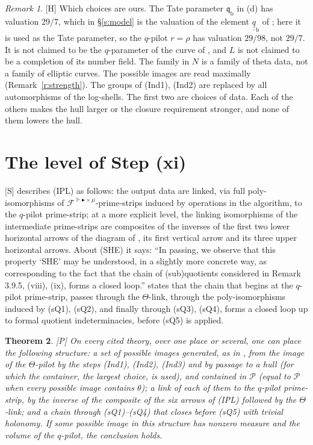 \documentclass[11pt]{article}
\theoremstyle{plain}
\newtheorem{theorem}{Theorem}
\theoremstyle{definition}
\theoremstyle{remark}
\newtheorem{remark}[theorem]{Remark}
\newcommand{\Smark}{\textup{[S]}}
\newcommand{\Pmark}{\textup{[P]}}
\newcommand{\Hmark}{\textup{[H]}}
\newcommand{\Poss}{\mathcal P}
\newcommand{\qbb}{\underline{\underline q}}
\newcommand{\fq}{\mathfrak q}
\begin{document}
\begin{remark}
\Hmark{} Which choices are ours. The Tate parameter $\fq_{\mathrm b}$ in (d) has valuation
$29/7$, which in \S\ref{s:model} is the valuation of the element $\qbb_{\mathrm b}$ of
\cite{First}; here it is used as the Tate parameter, so the $q$-pilot $r=\rho$ has
valuation $29/98$, not $29/7$. It is not claimed to be the $q$-parameter of the curve of
\cite{First}, and $L$ is not claimed to be a completion of its number field. The family in $N$ is a family of theta data, not a family
of elliptic curves. The possible images are read maximally (Remark~\ref{r:strength}). The
groups of (Ind1), (Ind2) are replaced by all automorphisms of the log-shells. The first two
are choices of data. Each of the others makes the hull larger or the closure requirement
stronger, and none of them lowers the hull.
\end{remark}

\section{The level of Step (xi)}\label{s:layer}

\Smark{} \cite[Rem.~3.11.1(iii)]{IUT3} describes (IPL) as follows: the output data are linked,
via full poly-isomorphisms of $\mathcal F^{\Vdash\blacktriangleright\times\mu}$-prime-strips induced by operations in
the algorithm, to the $q$-pilot prime-strip; at a more explicit level, the linking
isomorphisms of the intermediate prime-strips are composites of the inverses of the first
two lower horizontal arrows of the diagram of \cite[Rem.~3.10.2]{IUT3}, its first vertical
arrow and its three upper horizontal arrows. About (SHE) it says:
``In passing, we observe that this property `SHE' may be understood, in a slightly more
concrete way, as corresponding to the fact that the chain of (sub)quotients considered in
Remark 3.9.5, (viii), (ix), forms a closed loop.'' \cite[Rem.~3.9.5(ix)]{IUT3} states that
the chain that begins at the $q$-pilot prime-strip, passes through the $\Theta$-link, through
the poly-isomorphisms induced by (sQ1), (sQ2), and finally through (sQ3), (sQ4), forms a
closed loop up to formal quotient indeterminacies, before (sQ5) is applied.

\begin{theorem}\label{t:layer}
\Pmark{} On every cited theory, over one place or several, one can place the following
structure: a set of possible images generated, as in \cite[Rem.~3.11.1(iii)]{IUT3}, from
the image of the $\Theta$-pilot by the steps (Ind1), (Ind2), (Ind3) and by passage to a
hull (for which the container, the largest choice, is used), and contained in $\Poss$
(equal to $\Poss$ when every possible image contains $\theta$); a link of each of them to
the $q$-pilot prime-strip, by the inverse of the composite of the six arrows of (IPL)
followed by the $\Theta$-link; and a chain through (sQ1)--(sQ4) that closes before (sQ5)
with trivial holonomy. If some possible image in this structure has nonzero
measure and the volume of the $q$-pilot, the conclusion holds.
\end{theorem}
\end{document}
